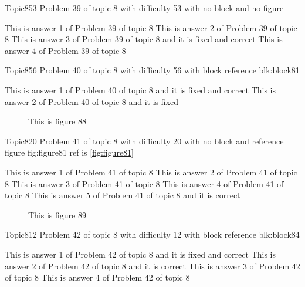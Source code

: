 \documentclass[master]{exam}
\begin{document}
\begin{problem}{Topic8}{53}
	Problem 39 of topic 8 with difficulty 53 with no block and no figure
	\begin{answers}
		\answer This is answer 1 of Problem 39 of topic 8 
		\answer This is answer 2 of Problem 39 of topic 8 
		 This is answer 3 of Problem 39 of topic 8 and it is fixed and correct
		\answer This is answer 4 of Problem 39 of topic 8 
	\end{answers}
\end{problem}

\begin{problem}[requires=blk:block81]{Topic8}{56}
	Problem 40 of topic 8 with difficulty 56 with block reference blk:block81
	\begin{answers}
		 This is answer 1 of Problem 40 of topic 8 and it is fixed and correct
		\answer[fixed] This is answer 2 of Problem 40 of topic 8 and it is fixed
	\end{answers}
\end{problem}



\begin{figure}
	\begin{center}
		This is figure 88 
		\label{fig:figure88}
	\end{center}
\end{figure}

\begin{problem}{Topic8}{20}
	Problem 41 of topic 8 with difficulty 20 with no block and reference figure fig:figure81 ref is \ref{fig:figure81}
	\begin{answers}
		\answer This is answer 1 of Problem 41 of topic 8 
		\answer This is answer 2 of Problem 41 of topic 8 
		\answer This is answer 3 of Problem 41 of topic 8 
		\answer This is answer 4 of Problem 41 of topic 8 
		\answer[correct] This is answer 5 of Problem 41 of topic 8 and it is correct
	\end{answers}
\end{problem}



\begin{figure}
	\begin{center}
		This is figure 89 
		\label{fig:figure89}
	\end{center}
\end{figure}

\begin{problem}[requires=blk:block84]{Topic8}{12}
	Problem 42 of topic 8 with difficulty 12 with block reference blk:block84
	\begin{answers}
		 This is answer 1 of Problem 42 of topic 8 and it is fixed and correct
		\answer[correct] This is answer 2 of Problem 42 of topic 8 and it is correct
		\answer This is answer 3 of Problem 42 of topic 8 
		\answer This is answer 4 of Problem 42 of topic 8 
	\end{answers}
\end{problem}
\end{document}
